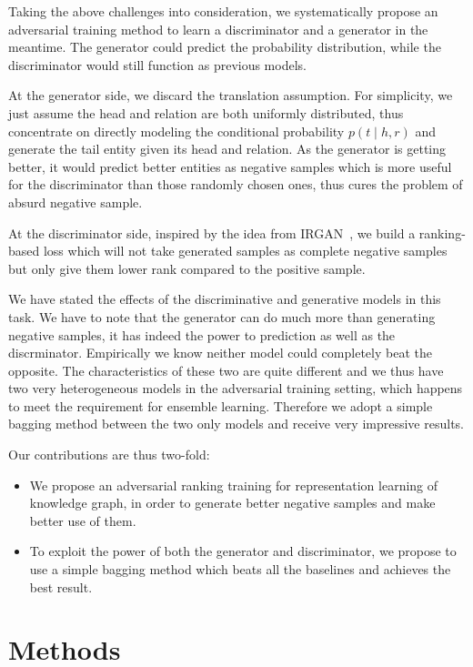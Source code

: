 \documentclass[twocolumn,a4paper,10pt,review,5p]{elsarticle}
\begin{document}
Taking the above challenges into consideration, we systematically propose an adversarial training method to learn a discriminator and a generator in the meantime. The generator could predict the probability distribution, while the discriminator would still function as previous models.

At the generator side, we discard the translation assumption. For simplicity, we just assume the head and relation are both uniformly distributed, thus concentrate on directly modeling the conditional probability $p(t\mid h, r)$ and generate the tail entity given its head and relation. As the generator is getting better, it would predict better entities as negative samples which is more useful for the discriminator than those randomly chosen ones, thus cures the problem of absurd negative sample.

At the discriminator side, inspired by the idea from IRGAN~\cite{IRGAN}, we build a ranking-based loss which will not take generated samples as complete negative samples but only give them lower rank compared to the positive sample.

We have stated the effects of the discriminative and generative models in this task. We have to note that the generator can do much more than generating negative samples, it has indeed the power to prediction as well as the discrminator. Empirically we know neither model could completely beat the opposite. The characteristics of these two are quite different and we thus have two very heterogeneous models in the adversarial training setting, which happens to meet the requirement for ensemble learning. Therefore we adopt a simple bagging method between the two only models and receive very impressive results.

Our contributions are thus two-fold:
\begin{itemize}
    \item We propose an adversarial ranking training for representation learning of knowledge graph, in order to generate better negative samples and make better use of them.
    \item To exploit the power of both the generator and discriminator, we propose to use a simple bagging method which beats all the baselines and achieves the best result.
\end{itemize}



\section{Methods}
\end{document}
